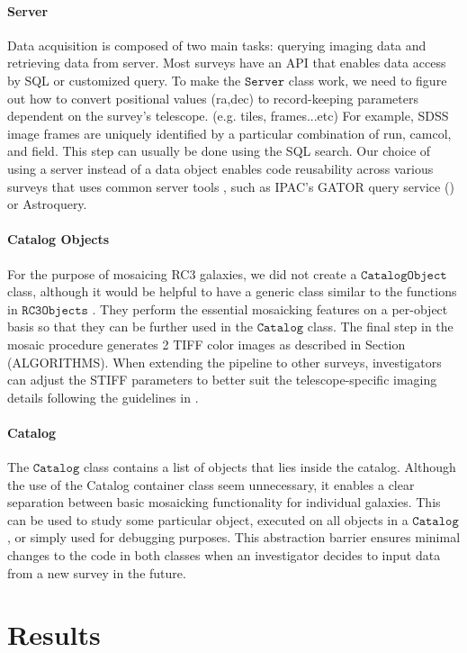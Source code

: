 \documentclass[5p]{elsarticle}
\begin{document}
 		\paragraph{Server}
		Data acquisition is composed of two main tasks: querying imaging data and retrieving data from server. Most surveys have an API that enables data access by SQL or customized query. To make the $\texttt{Server}$ class work, we need to figure out how to convert positional values (ra,dec) to record-keeping parameters dependent on the survey's telescope. (e.g. tiles, frames...etc) For example, SDSS image frames are uniquely identified by a particular combination of  run, camcol, and field.  This step can usually be done using the SQL search. Our choice of using a server instead of a data object enables code reusability across various surveys that uses common server tools , such as IPAC's GATOR query service (\citet{irsa}) or  Astroquery.
	\paragraph{Catalog Objects}
	For the purpose of mosaicing RC3 galaxies, we did not create a $\texttt{CatalogObject}$ class, although it would be helpful to have a generic class similar to the functions in $\texttt{RC3Objects}$	. They perform the essential mosaicking features on a per-object basis so that they can be further used in the $\texttt{Catalog}$ class. The final step in the mosaic procedure generates 2 TIFF color images as described in Section (ALGORITHMS).  When extending the pipeline to other surveys, investigators can adjust the STIFF parameters to better suit the telescope-specific imaging details following the guidelines in \citet{stiff}.
	\paragraph{Catalog}
	The $\texttt{Catalog}$ class contains a list of objects that lies inside the catalog. Although the use of the Catalog container class seem unnecessary, it enables a clear separation between basic mosaicking functionality for individual galaxies. This can be used to study some particular object, executed on all objects in a $\texttt{Catalog}$, or simply used for debugging purposes. This abstraction barrier ensures minimal changes to the code in both classes when an investigator decides to input data from a new survey in the future.
\section{Results}
\end{document}
